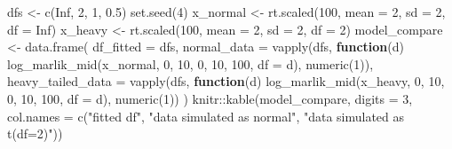 \documentclass[
  letterpaper,
  DIV=11,
  numbers=noendperiod]{scrreprt}
\newenvironment{Shaded}{\begin{snugshade}}{\end{snugshade}}
\newcommand{\AttributeTok}[1]{\textcolor[rgb]{0.40,0.45,0.13}{#1}}
\newcommand{\ConstantTok}[1]{\textcolor[rgb]{0.56,0.35,0.01}{#1}}
\newcommand{\ControlFlowTok}[1]{\textcolor[rgb]{0.00,0.23,0.31}{\textbf{#1}}}
\newcommand{\DecValTok}[1]{\textcolor[rgb]{0.68,0.00,0.00}{#1}}
\newcommand{\FloatTok}[1]{\textcolor[rgb]{0.68,0.00,0.00}{#1}}
\newcommand{\FunctionTok}[1]{\textcolor[rgb]{0.28,0.35,0.67}{#1}}
\newcommand{\NormalTok}[1]{\textcolor[rgb]{0.00,0.23,0.31}{#1}}
\newcommand{\OtherTok}[1]{\textcolor[rgb]{0.00,0.23,0.31}{#1}}
\newcommand{\SpecialCharTok}[1]{\textcolor[rgb]{0.37,0.37,0.37}{#1}}
\newcommand{\StringTok}[1]{\textcolor[rgb]{0.13,0.47,0.30}{#1}}
\begin{document}
\begin{Shaded}
\begin{Highlighting}[]
\NormalTok{dfs }\OtherTok{\textless{}{-}} \FunctionTok{c}\NormalTok{(}\ConstantTok{Inf}\NormalTok{, }\DecValTok{2}\NormalTok{, }\DecValTok{1}\NormalTok{, }\FloatTok{0.5}\NormalTok{)}
\FunctionTok{set.seed}\NormalTok{(}\DecValTok{4}\NormalTok{)}
\NormalTok{x\_normal }\OtherTok{\textless{}{-}} \FunctionTok{rt.scaled}\NormalTok{(}\DecValTok{100}\NormalTok{, }\AttributeTok{mean =} \DecValTok{2}\NormalTok{, }\AttributeTok{sd =} \DecValTok{2}\NormalTok{, }\AttributeTok{df =} \ConstantTok{Inf}\NormalTok{)}
\NormalTok{x\_heavy  }\OtherTok{\textless{}{-}} \FunctionTok{rt.scaled}\NormalTok{(}\DecValTok{100}\NormalTok{, }\AttributeTok{mean =} \DecValTok{2}\NormalTok{, }\AttributeTok{sd =} \DecValTok{2}\NormalTok{, }\AttributeTok{df =} \DecValTok{2}\NormalTok{)}
\NormalTok{model\_compare }\OtherTok{\textless{}{-}} \FunctionTok{data.frame}\NormalTok{(}
    \AttributeTok{df\_fitted        =}\NormalTok{ dfs,}
    \AttributeTok{normal\_data       =} \FunctionTok{vapply}\NormalTok{(dfs, }\ControlFlowTok{function}\NormalTok{(d) }\FunctionTok{log\_marlik\_mid}\NormalTok{(x\_normal, }\DecValTok{0}\NormalTok{, }\DecValTok{10}\NormalTok{, }\DecValTok{0}\NormalTok{, }\DecValTok{10}\NormalTok{, }\DecValTok{100}\NormalTok{, }\AttributeTok{df =}\NormalTok{ d), }\FunctionTok{numeric}\NormalTok{(}\DecValTok{1}\NormalTok{)),}
    \AttributeTok{heavy\_tailed\_data =} \FunctionTok{vapply}\NormalTok{(dfs, }\ControlFlowTok{function}\NormalTok{(d) }\FunctionTok{log\_marlik\_mid}\NormalTok{(x\_heavy,  }\DecValTok{0}\NormalTok{, }\DecValTok{10}\NormalTok{, }\DecValTok{0}\NormalTok{, }\DecValTok{10}\NormalTok{, }\DecValTok{100}\NormalTok{, }\AttributeTok{df =}\NormalTok{ d), }\FunctionTok{numeric}\NormalTok{(}\DecValTok{1}\NormalTok{))}
\NormalTok{)}
\NormalTok{knitr}\SpecialCharTok{::}\FunctionTok{kable}\NormalTok{(model\_compare, }\AttributeTok{digits =} \DecValTok{3}\NormalTok{,}
             \AttributeTok{col.names =} \FunctionTok{c}\NormalTok{(}\StringTok{"fitted df"}\NormalTok{, }\StringTok{"data simulated as normal"}\NormalTok{, }\StringTok{"data simulated as t(df=2)"}\NormalTok{))}
\end{Highlighting}
\end{Shaded}
\end{document}
